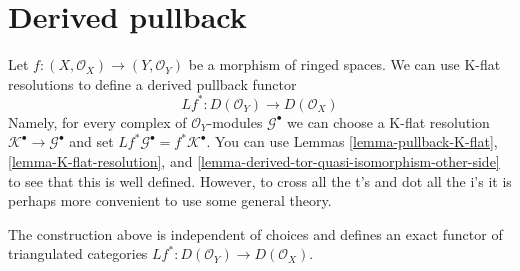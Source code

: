\section{Derived pullback}
\label{section-derived-pullback}

\noindent
Let $f : (X, \mathcal{O}_X) \to (Y, \mathcal{O}_Y)$
be a morphism of ringed spaces. We can use K-flat resolutions to define
a derived pullback functor
$$
Lf^* : D(\mathcal{O}_Y) \to D(\mathcal{O}_X)
$$
Namely, for every complex of $\mathcal{O}_Y$-modules $\mathcal{G}^\bullet$
we can choose a K-flat resolution
$\mathcal{K}^\bullet \to \mathcal{G}^\bullet$ and set
$Lf^*\mathcal{G}^\bullet = f^*\mathcal{K}^\bullet$.
You can use
Lemmas \ref{lemma-pullback-K-flat},
\ref{lemma-K-flat-resolution}, and
\ref{lemma-derived-tor-quasi-isomorphism-other-side}
to see that this is well defined. However, to cross all the t's and dot all
the i's it is perhaps more convenient to use some general theory.

\begin{lemma}
\label{lemma-derived-base-change}
The construction above is independent of choices and defines an exact
functor of triangulated categories
$Lf^* : D(\mathcal{O}_Y) \to D(\mathcal{O}_X)$.
\end{lemma}

